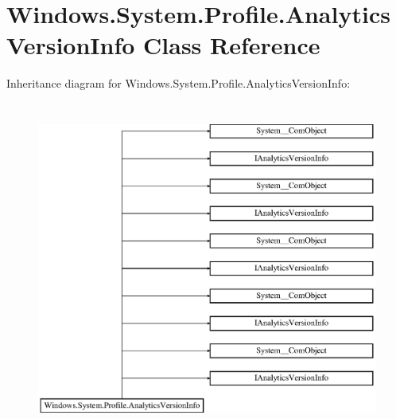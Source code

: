 \hypertarget{class_windows_1_1_system_1_1_profile_1_1_analytics_version_info}{}\section{Windows.\+System.\+Profile.\+Analytics\+Version\+Info Class Reference}
\label{class_windows_1_1_system_1_1_profile_1_1_analytics_version_info}
Inheritance diagram for Windows.\+System.\+Profile.\+Analytics\+Version\+Info\+:\begin{figure}[H]
\begin{center}
\leavevmode
\includegraphics[height=11.000000cm]{class_windows_1_1_system_1_1_profile_1_1_analytics_version_info}
\end{center}
\end{figure}
